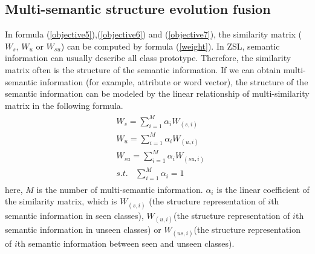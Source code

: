 \documentclass[review]{elsarticle}
\begin{document}
\subsection{Multi-semantic structure evolution fusion}
In formula (\ref{objective5}),(\ref{objective6}) and (\ref{objective7}), the similarity matrix ($W_{s}$, $W_{u}$ or $W_{su}$) can be computed by formula (\ref{weight}). In ZSL, semantic information can usually describe all class prototype. Therefore, the similarity matrix often is the structure of the semantic information. If we can obtain multi-semantic information (for example, attribute\cite{lampert2009learning} or word vector\cite{Socher2013Zero}), the structure of the semantic information can be modeled by the linear relationship of multi-similarity matrix in the following formula.
\begin{align}
\label{objective8}
\begin{aligned}
&W_{s}=\sum^{M}_{i=1}\alpha_{i}W_{(s,i)}\\
&W_{u}=\sum^{M}_{i=1}\alpha_{i}W_{(u,i)}\\
&W_{su}=\sum^{M}_{i=1}\alpha_{i}W_{(su,i)}\\
&s.t.~~~~\sum^{M}_{i=1}\alpha_{i}=1
 \end{aligned}
\end{align}
here, $M$ is the number of multi-semantic information. $\alpha_{i}$ is the linear coefficient of the similarity matrix, which is $W_{(s,i)}$ (the structure representation of $i$th semantic information in seen classes), $W_{(u,i)}$(the structure representation of $i$th semantic information in unseen classes) or $W_{(us,i)}$(the structure representation of $i$th semantic information between seen and unseen classes).
\end{document}
